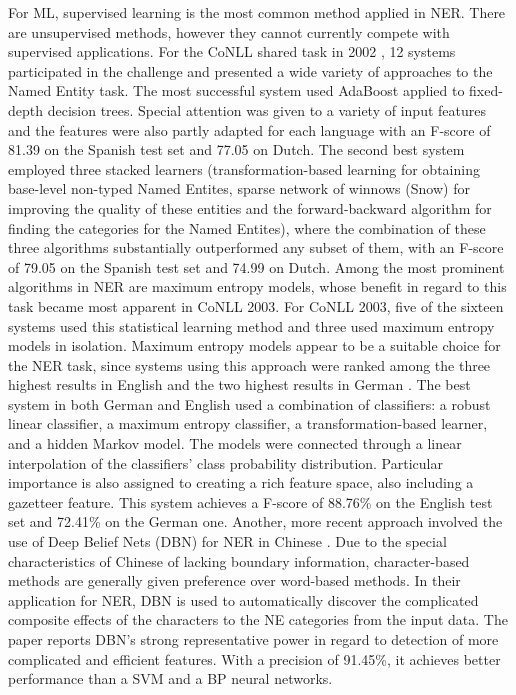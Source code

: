 \documentclass[11pt]{article}
\begin{document}
For ML, supervised learning is the most common method applied in NER.
There are unsupervised methods, however they cannot currently compete with supervised applications.
For the CoNLL shared task in 2002 \cite{tksintro}, 12 systems participated in the challenge and presented a wide variety of approaches to the Named Entity task.
The most successful system used AdaBoost applied to fixed-depth decision trees. Special attention was given to a variety of input features and the features were also
partly adapted for each language with an F-score of 81.39 on the Spanish test set and 77.05 on Dutch.
The second best system \cite{Florian:2002:NER:1118853.1118863} employed three stacked
learners (transformation-based learning for obtaining base-level non-typed Named Entites, sparse network of winnows (Snow) for improving the quality of these entities and the forward-backward algorithm for finding the categories for the Named Entites), where the combination of these three algorithms substantially outperformed any subset of them, with an F-score of 79.05 on the Spanish test set and 74.99 on Dutch.
Among the most prominent algorithms in NER are maximum entropy models, whose benefit in regard to this task became most apparent in CoNLL 2003. 
For CoNLL 2003, five of the sixteen systems used this statistical learning method and three used maximum entropy models in isolation.
Maximum entropy models appear to be a suitable choice for the NER task, since systems using this approach were ranked among the three highest results in 
English and the two highest results in German \cite{TjongKimSang:2003:ICS:1119176.1119195}.
The best system in both German and English \cite{Florian:2003:NER:1119176.1119201} used a combination of classifiers: a robust linear classifier, 
a maximum entropy classifier, a transformation-based learner, and a hidden Markov model. The models were connected through a linear interpolation of the classifiers’ %
class probability distribution. Particular importance is also assigned to creating a rich feature space, also including a gazetteer feature. 
This system achieves a F-score of 88.76\% on the English test set and 72.41\% on the German one.
Another, more recent approach involved the use of Deep Belief Nets (DBN) for NER in Chinese \cite{Chen:2010:UDB:1870457.1870473}.
Due to the special characteristics of Chinese of lacking boundary information, character-based methods are generally given preference over word-based methods.
In their application for NER, DBN  is used to automatically discover the complicated composite effects of the characters to the NE categories from the input data. 
The paper reports DBN's strong representative power in regard to detection of more complicated and efficient features. With a precision of 91.45\%,
it achieves better performance than a SVM and a BP neural networks.
\end{document}
